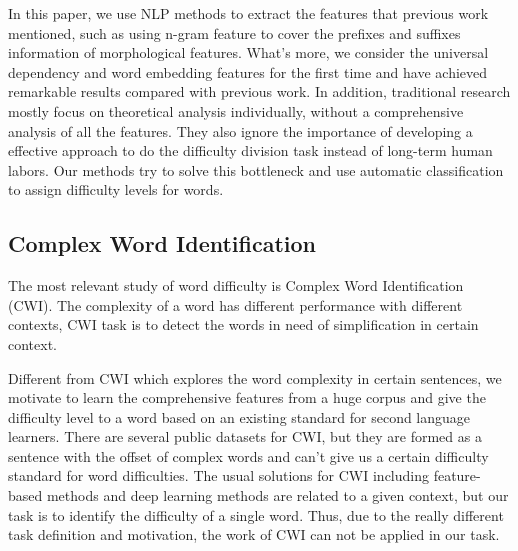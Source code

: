 In this paper, we use NLP methods to extract the features that previous work mentioned, such as using n-gram feature to cover the prefixes and suffixes information of morphological features.
What's more, we consider the universal dependency and word embedding features for the first time and have achieved remarkable results compared with previous work.
In addition, traditional research mostly focus on theoretical analysis individually, without a comprehensive analysis of all the features. 
They also ignore the importance of developing a effective approach to do the difficulty division task instead of long-term human labors.
Our methods try to solve this bottleneck and use automatic classification to assign difficulty levels for words.
\subsection{Complex Word Identification}
The most relevant study of word difficulty is Complex Word Identification (CWI).
The complexity of a word has different performance with different contexts,  CWI task is to detect the words in need of simplification in certain context.

Different from CWI which explores the word complexity in certain sentences, 
we motivate to learn the comprehensive features from a huge corpus 
and give the difficulty level to a word based on an existing standard for second language learners.
There are several public datasets for CWI, but they are formed as a sentence with the offset of complex words and can't give us a certain difficulty standard for word difficulties.
The usual solutions for CWI including feature-based methods and deep learning methods are related to a given context, but our task is to identify the difficulty of a single word.
Thus, due to the really different task definition and motivation, the work of CWI can not be applied in our task.






 